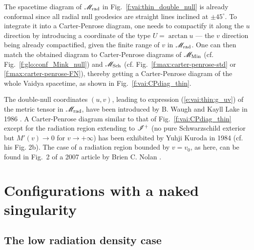 The spacetime diagram of $\mathscr{M}_{\rm rad}$ in Fig.~\ref{f:vai:thin_double_null}
is already conformal since all radial null geodesics are straight lines
inclined at $\pm 45^\circ$. To integrate it into a Carter-Penrose diagram,
one needs to compactify it along the $u$ direction by introducing a
coordinate of the type $U = \arctan u$ --- the $v$ direction being already
compactified, given the finite range of $v$ in $\mathscr{M}_{\rm rad}$.
One can then match the obtained diagram to
Carter-Penrose diagrams of $\mathscr{M}_{\rm Min}$ (cf. Fig.~\ref{f:glo:conf_Mink_null})
and $\mathscr{M}_{\rm Sch}$ (cf. Fig.~\ref{f:max:carter-penrose-std} or \ref{f:max:carter-penrose-FN}),
thereby getting a Carter-Penrose diagram of the whole Vaidya spacetime, as shown
in Fig.~\ref{f:vai:CPdiag_thin}.

\begin{hist}
The double-null coordinates $(u,v)$, leading to expression (\ref{e:vai:thin:g_uv}) of the
metric tensor in $\mathscr{M}_{\rm rad}$, have been introduced by
B. Waugh and Kayll Lake in 1986 \cite{WaughL86}.
A Carter-Penrose diagram similar to that of Fig.~\ref{f:vai:CPdiag_thin} except
for the radiation region extending to $\mathscr{I}^+$ (no pure Schwarzschild exterior but
$M'(v) \to 0$ for $v\to +\infty$) has been exhibited by Yuhji Kuroda
in 1984 \cite{Kurod84} (cf. his Fig. 2b).
The case of a radiation region bounded by $v = v_0$, as here, can be found in Fig.~2 of a 2007 article by
Brien C. Nolan \cite{Nolan07}.
\end{hist}



\section{Configurations with a naked singularity} \label{s:vai:naked_sing}

\subsection{The low radiation density case} \label{s:vai:low_alpha}

